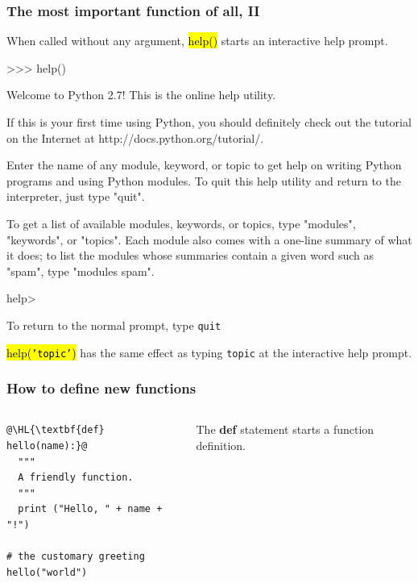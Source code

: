 \documentclass[english,serif,mathserif,xcolor=pdftex,dvipsnames,table]{beamer}
\begin{document}
\begin{frame}
  \frametitle{The most important function of all, II}

  When called without any argument, \hl{help()} starts an interactive
  help prompt.

  \+
  \begin{semiverbatim}\tiny
>>> help()

Welcome to Python 2.7!  This is the online help utility.

If this is your first time using Python, you should definitely check out
the tutorial on the Internet at http://docs.python.org/tutorial/.

Enter the name of any module, keyword, or topic to get help on writing
Python programs and using Python modules.  To quit this help utility and
return to the interpreter, just type "quit".

To get a list of available modules, keywords, or topics, type "modules",
"keywords", or "topics".  Each module also comes with a one-line summary
of what it does; to list the modules whose summaries contain a given word
such as "spam", type "modules spam".

help>
\end{semiverbatim}

  \+
  To return to the normal prompt, type \texttt{quit}

  \+
  \hl{help(\texttt{'topic'})} has the same effect as typing
  \texttt{topic} at the interactive help prompt.
\end{frame}

\begin{frame}[fragile]
  \frametitle{How to define new functions}
  \begin{columns}[t]
    \begin{column}{0.5\textwidth}
\begin{lstlisting}
@\HL{\textbf{def} hello(name):}@
  """
  A friendly function.
  """
  print ("Hello, " + name + "!")

# the customary greeting
hello("world")
\end{lstlisting}
    \end{column}
    \begin{column}{0.5\textwidth}
      \raggedleft
      The \textbf{def} statement starts a function definition.
    \end{column}
  \end{columns}
\end{frame}
\end{document}
